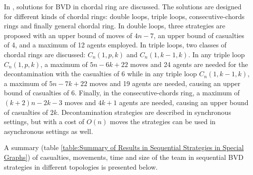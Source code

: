 In \cite{alotaibi}, solutions for BVD in chordal ring are discussed. The solutions are designed for  different kinds of chordal rings: double loops, triple loops, consecutive-chords rings and finally general chordal ring. In double loops,     three strategies  are proposed  
with an  upper bound of moves of  $4n-7$, an upper bound of casualties of 4, and a maximum of 12 agents   employed.
In triple loops,  two classes of chordal rings are discussed: $C_n(1,p,k)$  and $C_n(1,k-1,k)$. In any triple loop $C_n(1,p,k)$, a maximum of $5n-6k+22$ moves and 24 agents are needed for the decontamination with the casualties of 6 while in any triple loop $C_n(1,k-1,k)$, a maximum of $5n-7k+22$ moves and 19 agents are needed, causing an upper bound of casualties of 6. Finally, in the consecutive-chords ring, a maximum of $(k+2)n-2k-3$ moves and $4k+1$ agents are needed, causing an upper bound of casualties of $2k$. Decontamination strategies  are described  in synchronous settings, but   with a cost of $O(n)$ moves   the strategies can be used in asynchronous settings as well.

A summary (table \ref{table:Summary of Results in Sequential Strategies in Special Graphs}) of casualties, movements, time and size of the team in sequential BVD strategies in different topologies is presented below. 

